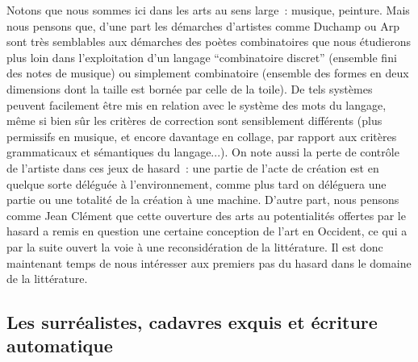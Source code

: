\documentclass{article}
\begin{document}
			Notons que nous sommes ici dans les arts au sens large : musique, peinture. Mais nous pensons que, d'une part les démarches d'artistes comme Duchamp ou Arp sont très semblables aux démarches des poètes combinatoires que nous étudierons plus loin dans l'exploitation d'un langage ``combinatoire discret'' (ensemble fini des notes de musique) ou simplement combinatoire (ensemble des formes en deux dimensions dont la taille est bornée par celle de la toile). De tels systèmes peuvent facilement être mis en relation avec le système des mots du langage, même si bien sûr les critères de correction sont sensiblement différents (plus permissifs en musique, et encore davantage en collage, par rapport aux critères grammaticaux et sémantiques du langage...). On note aussi la perte de contrôle de l'artiste dans ces jeux de hasard : une partie de l'acte de création est en quelque sorte déléguée à l'environnement, comme plus tard on déléguera une partie ou une totalité de la création à une machine. D'autre part, nous pensons comme Jean Clément que cette ouverture des arts au potentialités offertes par le hasard a remis en question une certaine conception de l'art en Occident, ce qui a par la suite ouvert la voie à une reconsidération de la littérature. Il est donc maintenant temps de nous intéresser aux premiers pas du hasard dans le domaine de la littérature.
		\subsection{Les surréalistes, cadavres exquis et écriture automatique}
\end{document}
